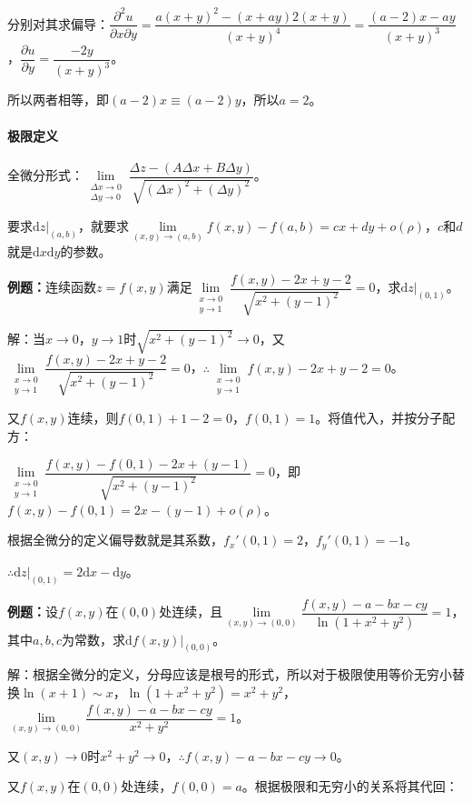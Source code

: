 \documentclass[UTF8, 12pt]{ctexart}
\begin{document}
分别对其求偏导：$\dfrac{\partial^2u}{\partial x\partial y}=\dfrac{a(x+y)^2-(x+ay)2(x+y)}{(x+y)^4}=\dfrac{(a-2)x-ay}{(x+y)^3}$，$\dfrac{\partial u}{\partial y}=\dfrac{-2y}{(x+y)^3}$。

所以两者相等，即$(a-2)x\equiv(a-2)y$，所以$a=2$。

\paragraph{极限定义} \leavevmode \medskip

全微分形式：$\lim\limits_{\substack{\Delta x\to0\\\Delta y\to0}}\dfrac{\Delta z-(A\Delta x+B\Delta y)}{\sqrt{(\Delta x)^2+(\Delta y)^2}}$。

要求$\textrm{d}z|_{(a,b)}$，就要求$\lim\limits_{(x,y)\to(a,b)}f(x,y)-f(a,b)=cx+dy+o(\rho)$，$c$和$d$就是$\textrm{d}x\textrm{d}y$的参数。

\textbf{例题：}连续函数$z=f(x,y)$满足$\lim\limits_{\substack{x\to0\\ y\to1}}\dfrac{f(x,y)-2x+y-2}{\sqrt{x^2+(y-1)^2}}=0$，求$\textrm{d}z|_{(0,1)}$。

解：当$x\to0$，$y\to1$时$\sqrt{x^2+(y-1)^2}\to0$，又$\lim\limits_{\substack{x\to0\\ y\to1}}\dfrac{f(x,y)-2x+y-2}{\sqrt{x^2+(y-1)^2}}=0$，$\therefore\lim\limits_{\substack{x\to0\\ y\to1}}f(x,y)-2x+y-2=0$。

又$f(x,y)$连续，则$f(0,1)+1-2=0$，$f(0,1)=1$。将值代入，并按分子配方：

$\lim\limits_{\substack{x\to0\\ y\to1}}\dfrac{f(x,y)-f(0,1)-2x+(y-1)}{\sqrt{x^2+(y-1)^2}}=0$，即$f(x,y)-f(0,1)=2x-(y-1)+o(\rho)$。

根据全微分的定义偏导数就是其系数，$f_x'(0,1)=2$，$f_y'(0,1)=-1$。

$\therefore\textrm{d}z|_{(0,1)}=2\textrm{d}x-\textrm{d}y$。

\textbf{例题：}设$f(x,y)$在$(0,0)$处连续，且$\lim\limits_{(x,y)\to(0,0)}\dfrac{f(x,y)-a-bx-cy}{\ln(1+x^2+y^2)}=1$，其中$a,b,c$为常数，求$\textrm{d}f(x,y)|_{(0,0)}$。

解：根据全微分的定义，分母应该是根号的形式，所以对于极限使用等价无穷小替换$\ln(x+1)\sim x$，$\ln(1+x^2+y^2)=x^2+y^2$，$\lim\limits_{(x,y)\to(0,0)}\dfrac{f(x,y)-a-bx-cy}{x^2+y^2}=1$。

又$(x,y)\to0$时$x^2+y^2\to0$，$\therefore f(x,y)-a-bx-cy\to0$。

又$f(x,y)$在$(0,0)$处连续，$f(0,0)=a$。根据极限和无穷小的关系将其代回：
\end{document}

